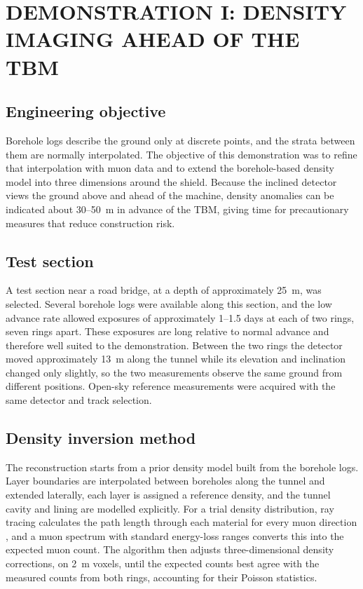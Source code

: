 \documentclass{WTC2027}
\begin{document}
\section{DEMONSTRATION I: DENSITY IMAGING AHEAD OF THE TBM}
\subsection{Engineering objective}
Borehole logs describe the ground only at discrete points, and the strata between them are normally interpolated. The objective of this demonstration was to refine that interpolation with muon data and to extend the borehole-based density model into three dimensions around the shield. Because the inclined detector views the ground above and ahead of the machine, density anomalies can be indicated about 30--50~m in advance of the TBM, giving time for precautionary measures that reduce construction risk.

\subsection{Test section}
A test section near a road bridge, at a depth of approximately 25~m, was selected. Several borehole logs were available along this section, and the low advance rate allowed exposures of approximately 1--1.5 days at each of two rings, seven rings apart. These exposures are long relative to normal advance and therefore well suited to the demonstration. Between the two rings the detector moved approximately 13~m along the tunnel while its elevation and inclination changed only slightly, so the two measurements observe the same ground from different positions. Open-sky reference measurements were acquired with the same detector and track selection.

\subsection{Density inversion method}
The reconstruction starts from a prior density model built from the borehole logs. Layer boundaries are interpolated between boreholes along the tunnel and extended laterally, each layer is assigned a reference density, and the tunnel cavity and lining are modelled explicitly. For a trial density distribution, ray tracing calculates the path length through each material for every muon direction \autocite{siddon1985}, and a muon spectrum \autocite{guan2015} with standard energy-loss ranges \autocite{groom2001} converts this into the expected muon count. The algorithm then adjusts three-dimensional density corrections, on 2~m voxels, until the expected counts best agree with the measured counts from both rings, accounting for their Poisson statistics.
\end{document}
